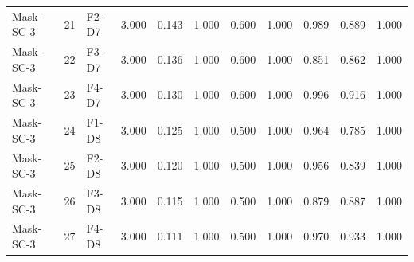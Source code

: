 \begin{table}[ht]
\begin{tabular}{lllrrrrrrrr}
Mask-SC-3 & 21 & F2-D7 & 3.000 & 0.143 & 1.000 & 0.600 & 1.000 & 0.989 & 0.889 & 1.000 \\
Mask-SC-3 & 22 & F3-D7 & 3.000 & 0.136 & 1.000 & 0.600 & 1.000 & 0.851 & 0.862 & 1.000 \\
Mask-SC-3 & 23 & F4-D7 & 3.000 & 0.130 & 1.000 & 0.600 & 1.000 & 0.996 & 0.916 & 1.000 \\
Mask-SC-3 & 24 & F1-D8 & 3.000 & 0.125 & 1.000 & 0.500 & 1.000 & 0.964 & 0.785 & 1.000 \\
Mask-SC-3 & 25 & F2-D8 & 3.000 & 0.120 & 1.000 & 0.500 & 1.000 & 0.956 & 0.839 & 1.000 \\
Mask-SC-3 & 26 & F3-D8 & 3.000 & 0.115 & 1.000 & 0.500 & 1.000 & 0.879 & 0.887 & 1.000 \\
Mask-SC-3 & 27 & F4-D8 & 3.000 & 0.111 & 1.000 & 0.500 & 1.000 & 0.970 & 0.933 & 1.000 \\
    \bottomrule
    \end{tabular}
\end{table}
